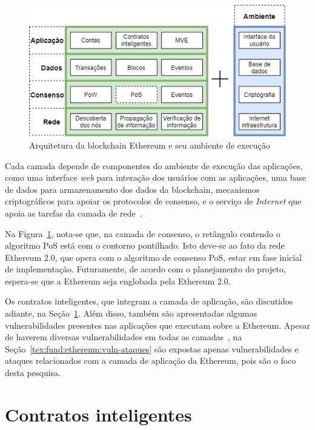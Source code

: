 \begin{figure}[htb]
 \caption{Arquitetura da blockchain Ethereum e seu ambiente de execução}
 \label{fig:eth-arquitetura}
 \centering
 \includegraphics[scale=0.5]{figuras/ethereum_arquitetura.png}
\end{figure}

Cada camada depende de componentes do ambiente de execução das aplicações, como uma interface \textit{web} para interação dos usuários com as aplicações, uma base de dados para armazenamento dos dados da blockchain, mecanismos criptográficos para apoiar os protocolos de consenso, e o serviço de \textit{Internet} que apoia as tarefas da camada de rede~\cite{chen2020survey-ethereum-acm}.

Na Figura~\ref{fig:eth-arquitetura}, nota-se que, na camada de consenso, o retângulo contendo o algoritmo PoS está com o contorno pontilhado. Isto deve-se ao fato da rede Ethereum 2.0, que opera com o algoritmo de consenso PoS, estar em fase inicial de implementação. Futuramente, de acordo com o planejamento do projeto, espera-se que a Ethereum seja englobada pela Ethereum 2.0.

Os contratos inteligentes, que integram a camada de aplicação, são discutidos adiante, na Seção~\ref{tex:fund:ethereum:smartc}. Além disso, também são apresentadas algumas vulnerabilidades presentes nas aplicações que executam sobre a Ethereum. Apesar de haverem diversas vulnerabilidades em todas as camadas~\cite{chen2020survey-ethereum-acm}, na Seção~\ref{tex:fund:ethereum:vuln-ataques} são expostas apenas vulnerabilidades e ataques relacionados com a camada de aplicação da Ethereum, pois são o foco desta pesquisa.  


\section{Contratos inteligentes} \label{tex:fund:ethereum:smartc}

